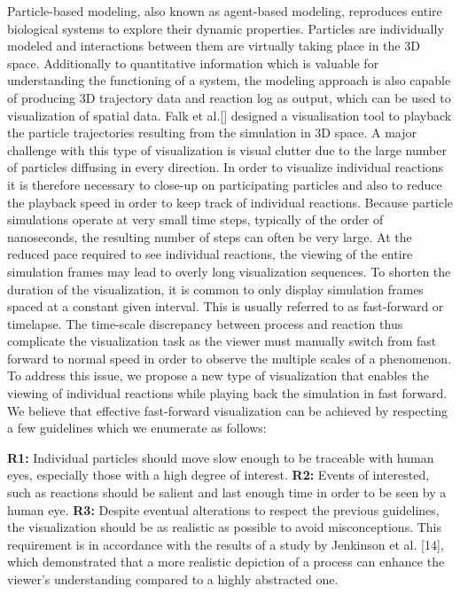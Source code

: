 Particle-based modeling, also known as agent-based modeling, reproduces entire biological systems to explore their dynamic properties.
Particles are individually modeled and interactions between them are virtually taking place in the 3D space.
Additionally to quantitative information which is valuable for understanding the functioning of a system, the modeling approach is also capable of producing 3D trajectory data and reaction log as output, which can be used to visualization of spatial data.
Falk et al.[] designed a visualisation tool to playback the particle trajectories resulting from the simulation in 3D space.
A major challenge with this type of visualization is visual clutter due to the large number of particles diffusing in every direction.
In order to visualize individual reactions it is therefore necessary to close-up on participating particles and also to reduce the playback speed in order to keep track of individual reactions.
Because particle simulations operate at very small time steps, typically of the order of nanoseconds, the resulting number of steps can often be very large. 
At the reduced pace required to see individual reactions, the viewing of the entire simulation frames may lead to overly long visualization sequences.
To shorten the duration of the visualization, it is common to only display simulation frames spaced at a constant given interval. 
This is usually referred to as fast-forward or timelapse.
The time-scale discrepancy between process and reaction thus complicate the visualization task as the viewer must manually switch from fast forward to normal speed in order to observe the multiple scales of a phenomenon.
To address this issue, we propose a new type of visualization that enables the viewing of individual reactions while playing back the simulation in fast forward.
We believe that effective fast-forward visualization can be achieved by respecting a few guidelines which we enumerate as follows:

\textbf{R1:} Individual particles should move slow enough to be traceable with human eyes, especially those with a high degree of interest.
\textbf{R2:} Events of interested, such as reactions should be salient and last enough time in order to be seen by a human eye.
\textbf{R3:} Despite eventual alterations to respect the previous guidelines, the visualization should be as realistic as possible to avoid misconceptions. This requirement is in accordance with the results of a study by Jenkinson et al. [14], which demonstrated that a more realistic depiction of a process can enhance the viewer’s understanding compared to a highly abstracted one.

